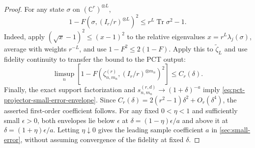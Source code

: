 \documentclass[11pt]{article}
\theoremstyle{remark}
\theoremstyle{plain}
\newcommand{\C}{\mathbb C}
\newcommand{\Tr}{\operatorname{Tr}}
\newcommand{\ot}{\otimes}
\begin{document}
\begin{proof}
For any state \(\sigma\) on \((\C^r)^{\ot L}\),
\[
  1-F\!\left(\sigma,(I_r/r)^{\ot L}\right)^2
  \le r^L\Tr\sigma^2-1.
\]
Indeed, apply \((\sqrt x-1)^2\le(x-1)^2\) to the relative eigenvalues
\(x=r^L\lambda_j(\sigma)\), average with weights \(r^{-L}\), and use
\(1-F^2\le2(1-F)\).
Apply this to \(\widetilde\zeta_L\) and use fidelity continuity to
transfer the bound to the PCT output:
\begin{equation}\label{eq:pct-projector-internal-small-error}
  \limsup_n
  \left[1-F\!\left(\zeta_{n,m_n}^{(r)},
                         (I_r/r)^{\ot m_n}\right)^2\right]
  \le C_r(\delta).
\end{equation}
Finally, the exact support factorization and
\(s_{n,m_n}^{(r,d)}\to(1+\delta)^{-a}\) imply
\eqref{eq:pct-projector-small-error-envelope}.
Since \(C_r(\delta)=2(r^2-1)\delta^2+O_r(\delta^4)\), the asserted
first-order coefficient follows.  For any fixed \(0<\eta<1\) and
sufficiently small \(\epsilon>0\), both envelopes lie below \(\epsilon\)
at \(\delta=(1-\eta)\epsilon/a\) and above it at
\(\delta=(1+\eta)\epsilon/a\).  Letting \(\eta\downarrow0\) gives the
leading sample coefficient \(a\) in \cref{sec:small-error}, without
assuming convergence of the fidelity at fixed \(\delta\).
\end{proof}
\end{document}
